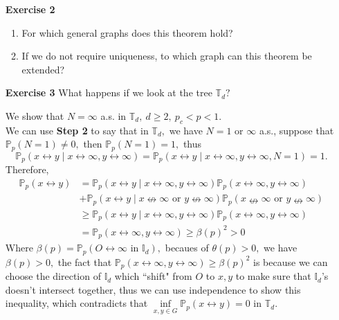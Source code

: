 \documentclass[12pt,a4paper]{report}
\theoremstyle{definition}
\newcommand{\SOL}{\fbox{ \tt s\parbox[b][2pt][c]{6pt}{o}\hspace*{-7pt} L:}}
\begin{document}
\begin{enumerate}
\begin{proof}
\[\inf_{G\in g} \frac{|\partial G|}{G}=0.\]This is essential to establish the inequality at the end of the proof.
\end{proof}
	\item[\textbf{Exercise 2}] \begin{enumerate}
		\item For which general graphs does this theorem hold?
		\item If we do not require uniqueness, to which graph can this theorem be extended?
	\end{enumerate}
	\item[\textbf{Exercise 3}] What happens if we look at the tree $\mathbb{T}_d?$
	\item[\SOL] We show that $N=\infty$ a.s. in $\mathbb{T}_d,\ d\geq 2,\ p_c<p<1.$\\
	We can use \textbf{Step 2} to say that in $\mathbb{T}_d,$ we have $N=1$ or $\infty$ a.s., suppose that \\ $\mathbb{P}_p(N=1)\neq 0,$ then $\mathbb{P}_p(N=1)=1,$ thus
	\[
	\mathbb{P}_p(x\leftrightarrow y\mid x\leftrightarrow\infty , y\leftrightarrow\infty)=\mathbb{P}_p(x\leftrightarrow y\mid x\leftrightarrow\infty , y\leftrightarrow\infty,N=1)=1.
	\]
	Therefore,
	\begin{align*}
	    \mathbb{P}_p(x\leftrightarrow y)&=\mathbb{P}_p(x\leftrightarrow y\mid x\leftrightarrow \infty,y\leftrightarrow\infty )\mathbb{P}_p(x\leftrightarrow\infty, y\leftrightarrow\infty)\\
	    &+\mathbb{P}_p(x\leftrightarrow y\mid x\nleftrightarrow \infty\mbox{ or }y\nleftrightarrow\infty )\mathbb{P}_p(x\nleftrightarrow \infty\mbox{ or }y\nleftrightarrow\infty )\\
	    &\geq \mathbb{P}_p(x\leftrightarrow y\mid x\leftrightarrow \infty,y\leftrightarrow\infty )\mathbb{P}_p(x\leftrightarrow\infty, y\leftrightarrow\infty)\\
	    &=\mathbb{P}_p(x\leftrightarrow\infty, y\leftrightarrow\infty)\geq \beta(p)^2>0
	\end{align*}
	Where $\beta(p)=\mathbb{P}_p(O\leftrightarrow\infty\mbox{ in }\mathbb{I}_d),$ becaues of $\theta(p)>0,$ we have $\beta(p)>0,$ the fact that $\mathbb{P}_p(x\leftrightarrow\infty , y\leftrightarrow\infty)\geq \beta(p)^2$ is because we can choose the direction of $\mathbb{I}_d$ which ``shift" from $O$ to $x,y$ to make sure that $\mathbb{I}_d$'s doesn't intersect together, thus we can use independence to show this inequality,
	which contradicts that $\inf\limits_{x,y\in G}\mathbb{P}_p(x\leftrightarrow y)=0$ in $\mathbb{T}_d.$\\

\end{enumerate}
\end{document}
